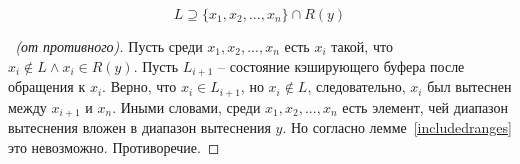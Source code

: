 \begin{lemma}
$$L \supseteq \{x_1, x_2, ..., x_n\} \cap R(y)$$
\end{lemma}
\begin{proof}[\proofname~(от противного)]
Пусть среди $x_1, x_2, ..., x_n$ есть $x_i$ такой, что $x_i \notin L
\wedge x_i \in R(y)$. Пусть $L_{i+1}$ -- состояние кэширующего
буфера после обращения к $x_i$. Верно, что $x_i \in L_{i+1}$, но
$x_i \notin L$, следовательно, $x_i$ был вытеснен между $x_{i+1}$ и
$x_n$. Иными словами, среди $x_1, x_2, ..., x_n$ есть элемент, чей
диапазон вытеснения вложен в диапазон вытеснения $y$. Но согласно
лемме~\ref{includedranges} это невозможно. Противоречие.
\end{proof}

